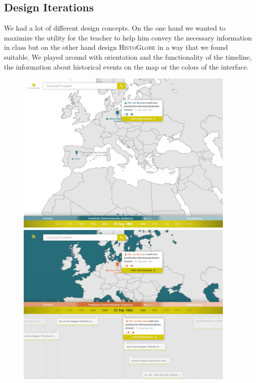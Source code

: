 \subsection*{Design Iterations}
We had a lot of different design concepts. On the one hand we wanted to maximize the utility for the teacher to help him convey the necessary information in class but on the other hand design \textsc{HistoGlobe} in a way that we found suitable. We played around with orientation and the functionality of the timeline, the information about historical events on the map or the colors of the interface.

\begin{figure}[H]
  \centering
  \begin{minipage}{0.32\textwidth}
    \includegraphics[width=0.95\textwidth]{graphics/design-2.jpg}
  \end{minipage}
  \begin{minipage}{0.32\textwidth}
    \includegraphics[width=0.95\textwidth]{graphics/design-3.jpg}

\end{minipage}
\end{figure}
